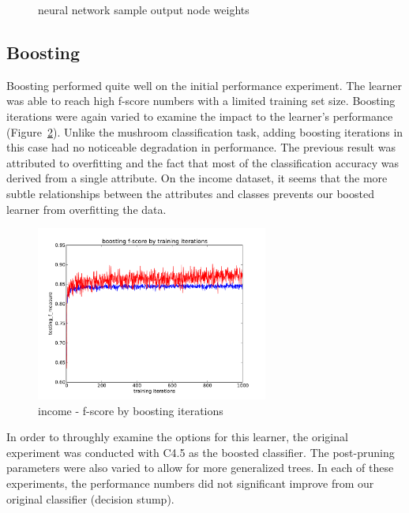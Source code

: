 \documentclass{sig-alternate}
\begin{document}
\begin{figure}[!htbp]
    \centering
    \theverbbox
    \caption{neural network sample output node weights \label{ad-nn-weights}}
\end{figure}


\subsection{Boosting}

Boosting performed quite well on the initial performance experiment. The learner was able to reach high f-score numbers with a limited training set size. Boosting iterations were again varied to examine the impact to the learner's performance (Figure~\ref{ad-boost-iter}). Unlike the mushroom classification task, adding boosting iterations in this case had no noticeable degradation in performance. The previous result was attributed to overfitting and the fact that most of the classification accuracy was derived from a single attribute. On the income dataset, it seems that the more subtle relationships between the attributes and classes prevents our boosted learner from overfitting the data.

\begin{figure}[!htbp]
    \centering
    \includegraphics[width=3in]{data/adult/boosting/training-iterations.pdf}
    \caption{income - f-score by boosting iterations \label{ad-boost-iter}}
\end{figure} 

In order to throughly examine the options for this learner, the original experiment was conducted with C4.5 as the boosted classifier. The post-pruning parameters were also varied to allow for more generalized trees. In each of these experiments, the performance numbers did not significant improve from our original classifier (decision stump).
\end{document}
